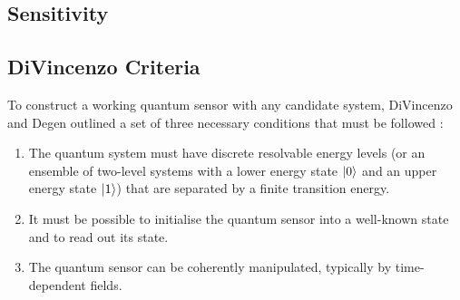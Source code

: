 \subsection{Sensitivity}
\cite{RevModPhys.92.015004}

\cite{PhysRevApplied.4.014009}


\cite{PhysRevApplied.15.064022}

\cite{PhysRevResearch.2.023394}


\cite{Castelletto2019}

\cite{Zhou2023}

\subsection{DiVincenzo Criteria}
To construct a working quantum sensor with any candidate system, DiVincenzo and Degen outlined a set of three necessary conditions that must be followed \cite{Crawford2021, RevModPhys.89.035002}
: 
\begin{enumerate}
    \item The quantum system must have discrete resolvable energy levels (or an ensemble of two-level systems with a lower energy state $\ket{0}$ and an upper energy state $\ket{1}$) that are separated by a finite transition energy. 
    \item It must be possible to initialise the quantum sensor into a well-known state and to read out its state. 
    \item The quantum sensor can be coherently manipulated, typically by time-dependent fields.
\end{enumerate} 

